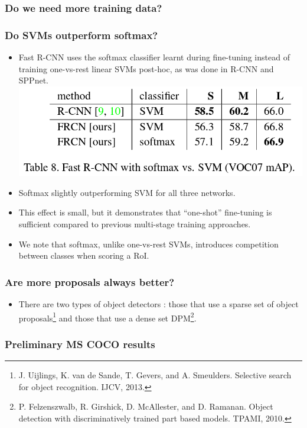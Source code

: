 \documentclass[11pt]{article}
\begin{document}
\subsubsection{Do we need more training data?}
\label{sec-1-4-3}
\subsubsection{Do SVMs outperform softmax?}
\label{sec-1-4-4}


\begin{itemize}
\item Fast R-CNN uses the softmax classifier learnt during fine-tuning instead of
      training one-vs-rest linear SVMs post-hoc, as was done in R-CNN and SPPnet.
      \includegraphics[width=.9\linewidth]{./pic_fast_rcnn/table8.png}
\item Softmax slightly outperforming SVM for all three networks.
\item This effect is small, but it demonstrates that ``one-shot'' fine-tuning is sufficient
      compared to previous multi-stage training approaches.
\item We note that softmax, unlike one-vs-rest SVMs, introduces competition between classes
      when scoring a RoI.
\end{itemize}
\subsubsection{Are more proposals always better?}
\label{sec-1-4-5}


\begin{itemize}
\item There are two types of object detectors : those that use a sparse set of object 
      proposals\footnote{J. Uijlings, K. van de Sande, T. Gevers, and A. Smeulders.
Selective search for object recognition.
IJCV, 2013.
 } and those that use a dense set DPM\footnote{P.  Felzenszwalb,  R.  Girshick,  D.  McAllester,  and  D.  Ramanan.   
Object detection with discriminatively trained part based models.
TPAMI, 2010.
 }.
\end{itemize}
\subsubsection{Preliminary MS COCO results}
\label{sec-1-4-6}
\end{document}
